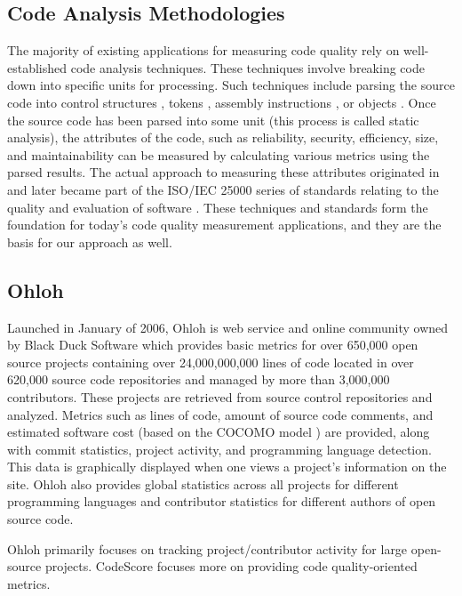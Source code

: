 \documentclass{sig-alternate}
\begin{document}
\subsection{Code Analysis Methodologies}
The majority of existing applications for measuring code quality rely on
well-established code analysis techniques. These techniques involve breaking
code down into specific units for processing. Such
techniques include parsing the source code into control structures
\cite{mccabe1976complexity}, tokens \cite{halstead1977elements}, assembly
instructions \cite{park1992software}, or objects \cite{chidamber1994metrics}.
Once the source code has been parsed into some unit (this process is called
static analysis), the attributes of the code, such as reliability, security,
efficiency, size, and maintainability can be measured by calculating various
metrics using the parsed results.
The actual approach to measuring these attributes originated in
\cite{boehm1976quantitative} and later became part of the ISO/IEC 25000 series
of standards relating to the quality and evaluation of software
\cite{iso2011iec}. These techniques and standards form the foundation for
today's code quality measurement applications, and they are the basis for our
approach as well.

\subsection{Ohloh}
Launched in January of 2006, Ohloh \cite{allen2009ohloh} is web service and
online community owned by Black Duck Software which provides basic metrics for
over 650,000 open source projects containing over 24,000,000,000 lines of code
located in over 620,000 source code repositories and managed by more than
3,000,000 contributors. These projects are retrieved from source control
repositories and analyzed. Metrics such as lines of code, amount of source code
comments, and estimated software cost (based on the COCOMO model
\cite{boehm2000software}) are provided, along with commit statistics, project
activity, and programming language detection. This data is graphically displayed
when one views a project's information on the site. Ohloh also provides global
statistics across all projects for different programming languages and
contributor statistics for different authors of open source code. 

Ohloh primarily focuses on tracking project/contributor activity for large
open-source projects. CodeScore focuses more on providing code quality-oriented
metrics.
\end{document}
